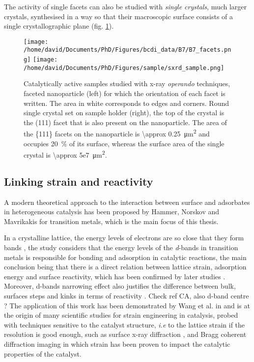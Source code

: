 The activity of single facets can also be studied with \textit{single crystals}, much larger crystals, synthesised in a way so that their macroscopic surface consists of a single crystallographic plane (fig. \ref{fig:Samples}).

\begin{figure}[!htb]
    \centering
    \texttt{[image: /home/david/Documents/PhD/Figures/bcdi\_data/B7/B7\_facets.png]}
    \texttt{[image: /home/david/Documents/PhD/Figures/sample/sxrd\_sample.png]}
    \caption{
        Catalytically active samples studied with x-ray \textit{operando} techniques, faceted nanoparticle (left) for which the orientation of each facet is written.
        The area in white corresponds to edges and corners.
        Round single crystal set on sample holder (right), the top of the crystal is the (111) facet that is also present on the nanoparticle.
        The area of the \{111\} facets on the nanoparticle is \qty{\approx 0.25}{\um^2} and occupies \qty{20}{\percent} of its surface, whereas the surface area of the single crystal is \qty{\approx 5e7}{\um^2}.
    }
    \label{fig:Samples}
\end{figure}

\subsection{Linking strain and reactivity}

A modern theoretical approach to the interaction between surface and adsorbates in heterogeneous catalysis has been proposed by Hammer, Norskov and Mavrikakis \parencite*{Hammer1995, Mavrikakis1998, Hammer2000} for transition metals, which is the main focus of this thesis.

In a crystalline lattice, the energy levels of electrons are so close that they form bands \parencite{Ashcroft76}, the study considers that the energy levels of the \textit{d}-bands in transition metals is responsible for bonding and adsorption in catalytic reactions, the main conclusion being that there is a direct relation between lattice strain, adsorption energy and surface reactivity, which has been confirmed by later studies \parencite{Kitchin2004, Kibler2005, Ontaneda2015}.
Moreover, d-bands narrowing effect also justifies the difference between bulk, surfaces steps and kinks in terms of reactivity \parencite{Haydock1972, DESJONQUERES1975, EGELHOFF1987, Hammer2006}.
\textcolor{Important}{Check ref CA, also d-band centre ?}
The application of this work has been demonstrated by Wang et al. in \cite*{Wang2016} and is at the origin of many scientific studies for strain engineering in catalysis, probed with techniques sensitive to the catalyst structure, \textit{i.e} to the lattice strain if the resolution is good enough, such as surface x-ray diffraction \parencite{Resta2020a}, and Bragg coherent diffraction imaging \parencite{Sneed2015, ulvestad_situ_2016, Kim2019, Bjorling2019, Passos2020, Carnis2021a, Carnis2021b, Dupraz2022} in which strain has been proven to impact the catalytic properties of the catalyst.

